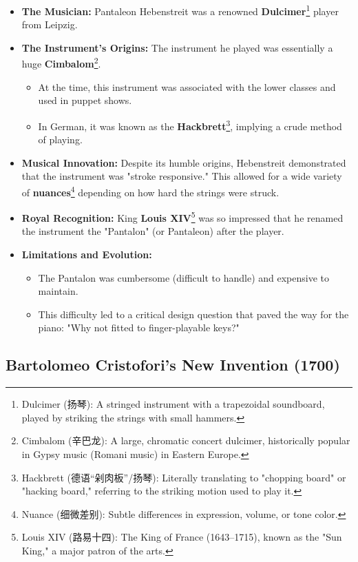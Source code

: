 \documentclass[math,code]{amznotes}
\theoremstyle{remark}
\begin{document}
\begin{itemize}
    \item \textbf{The Musician:} Pantaleon Hebenstreit was a renowned \textbf{Dulcimer}\footnote{Dulcimer (扬琴): A stringed instrument with a trapezoidal soundboard, played by striking the strings with small hammers.} player from Leipzig.
    \item \textbf{The Instrument's Origins:} The instrument he played was essentially a huge \textbf{Cimbalom}\footnote{Cimbalom (辛巴龙): A large, chromatic concert dulcimer, historically popular in Gypsy music (Romani music) in Eastern Europe.}.
    \begin{itemize}
        \item At the time, this instrument was associated with the lower classes and used in puppet shows.
        \item In German, it was known as the \textbf{Hackbrett}\footnote{Hackbrett (德语“剁肉板”/扬琴): Literally translating to "chopping board" or "hacking board," referring to the striking motion used to play it.}, implying a crude method of playing.
    \end{itemize}
    \item \textbf{Musical Innovation:} Despite its humble origins, Hebenstreit demonstrated that the instrument was "stroke responsive." This allowed for a wide variety of \textbf{nuances}\footnote{Nuance (细微差别): Subtle differences in expression, volume, or tone color.} depending on how hard the strings were struck.
    \item \textbf{Royal Recognition:} King \textbf{Louis XIV}\footnote{Louis XIV (路易十四): The King of France (1643–1715), known as the "Sun King," a major patron of the arts.} was so impressed that he renamed the instrument the "Pantalon" (or Pantaleon) after the player.
    \item \textbf{Limitations and Evolution:}
    \begin{itemize}
        \item The Pantalon was cumbersome (difficult to handle) and expensive to maintain.
        \item This difficulty led to a critical design question that paved the way for the piano: "Why not fitted to finger-playable keys?"
    \end{itemize}
\end{itemize}

\subsection{Bartolomeo Cristofori's New Invention (1700)}
\end{document}
